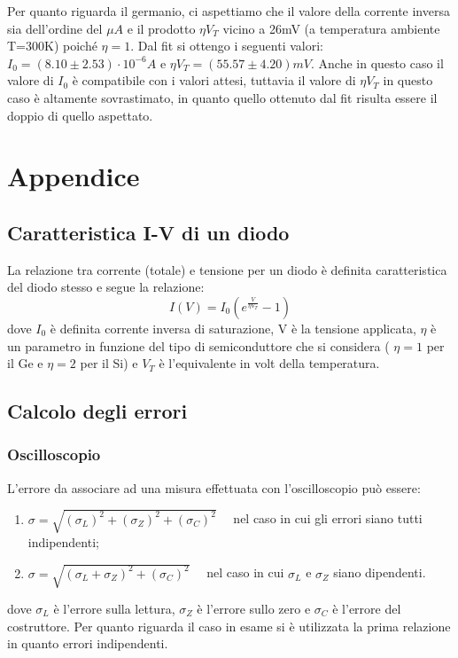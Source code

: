 \documentclass[a4paper, 11pt]{article}
\begin{document}
Per quanto riguarda il germanio, ci aspettiamo che il valore della corrente inversa sia dell'ordine del $\mu A$ e il prodotto $\eta V_T$ vicino a 26mV (a temperatura ambiente T=300K) poiché $\eta = 1$. Dal fit si ottengo i seguenti valori: $I_0 = ( 8.10 \pm 2.53) \cdot 10^{-6} A $ e $\eta V_T = ( 55.57 \pm 4.20) mV$. Anche in questo caso il valore di $I_0$ è compatibile con i valori attesi, tuttavia il valore di $\eta V_T$ in questo caso è altamente sovrastimato, in quanto quello ottenuto dal fit risulta essere il doppio di quello aspettato.

\newpage
\section{Appendice}

\subsection{Caratteristica I-V di un diodo}
\label{carIV}
La relazione tra corrente (totale) e tensione per un diodo è definita  caratteristica del diodo stesso e segue la relazione:
\begin{equation}
    I(V)=I_0 (e^{\frac{V}{\eta V_T}}-1)
    \label{eq:caratteristica IV}
\end{equation}
dove $I_0$ è definita corrente inversa di saturazione, V è la tensione applicata, $\eta$ è un parametro in funzione del tipo di semiconduttore che si considera ( $\eta = 1 $ per il Ge e $\eta = 2$ per il Si) e $V_T$ è l'equivalente in volt della temperatura.
\subsection{Calcolo degli errori}
\label{errori}
\subsubsection{Oscilloscopio}
L'errore da associare ad una misura effettuata con l'oscilloscopio può essere:
\begin{enumerate}
    \item $\sigma = \sqrt{(\sigma_L)^2 + (\sigma_Z)^2 + (\sigma_C)^2} \quad$ nel caso in cui gli errori siano tutti indipendenti;
    \item  $\sigma = \sqrt{(\sigma_L + \sigma_Z)^2 + (\sigma_C)^2} \quad$ nel caso in cui $\sigma_L$ e $\sigma_Z$ siano dipendenti.
    \end{enumerate}
dove $\sigma_L$ è l'errore sulla lettura, $\sigma_Z$ è l'errore sullo zero e $\sigma_C$ è l'errore del costruttore. Per quanto riguarda il caso in esame si è utilizzata la prima relazione in quanto errori indipendenti.
\end{document}
